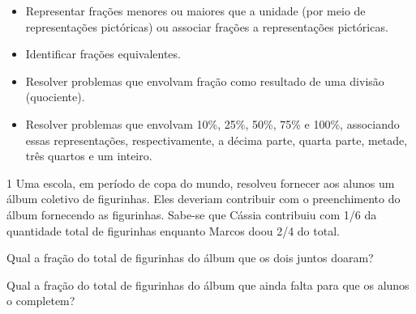 {


\begin{itemize}
\item Representar frações menores ou maiores que a unidade (por meio de
representações pictóricas) ou associar frações a representações pictóricas.

\item Identificar frações equivalentes.

\item Resolver problemas que envolvam fração como resultado de uma divisão
(quociente).

\item Resolver problemas que envolvam 10\%, 25\%, 50\%, 75\% e 100\%,
associando essas representações, respectivamente, a décima parte, quarta parte, metade,
três quartos e um inteiro.
\end{itemize}




\num{1} Uma escola, em período de copa do mundo, resolveu fornecer aos
alunos um álbum coletivo de figurinhas. Eles deveriam contribuir com o
preenchimento do álbum fornecendo as figurinhas. Sabe-se que Cássia
contribuiu com 1/6 da quantidade total de figurinhas enquanto Marcos doou 2/4 do total.

\begin{escolha}
\item
  Qual a fração do total de figurinhas do álbum que os dois juntos doaram?


\item
  Qual a fração do total de figurinhas do álbum que ainda falta para que os
  alunos o completem?


\end{escolha}}
